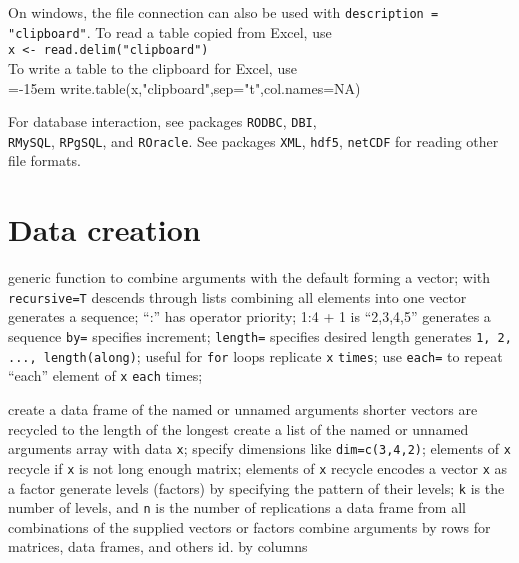 On windows, the file connection can also be used with {\tt description =
"clipboard"}. To read a table copied from Excel, use \\
{\tt x <- read.delim("clipboard")}\\
To write a table to the clipboard for Excel, use \\
{\smalltt  \emergencystretch=-15em write.table(x,"clipboard",sep="\bs t",col.names=NA)}

For database interaction, see packages {\tt RODBC}, {\tt DBI},\\
{\tt RMySQL}, {\tt RPgSQL}, and {\tt ROracle}. See packages {\tt XML},
{\tt hdf5}, {\tt netCDF} for reading other file formats.

\section{Data creation}{}

	{generic function to combine arguments with the default forming a vector; with {\tt recursive=T} descends through lists combining all elements into one vector}
	{generates a sequence; ``:'' has operator priority; 1:4 + 1 is ``2,3,4,5''}
	{generates a sequence {\tt by=} specifies increment; {\tt length=} specifies desired length}
	{generates {\tt 1, 2, ..., length(along)}; useful for {\tt for} loops}
	{replicate {\tt x} {\tt times}; use {\tt each=} to repeat ``each'' element of {\tt x} {\tt each} times;}

	{create a data frame of the named or unnamed arguments}
	{shorter vectors are recycled to the length of the longest}
	{create a list of the named or unnamed arguments }
	{array with data {\tt x}; specify dimensions like {\tt dim=c(3,4,2)}; elements of {\tt x} recycle if {\tt x} is not long enough}
	{matrix; elements of {\tt x} recycle}
	{encodes a vector {\tt x} as a factor}
	{generate levels (factors) by specifying the pattern of their levels; {\tt k} is the number of levels, and {\tt n} is the number of replications}
	{a data frame from all combinations of the supplied vectors or factors}
	{combine arguments by rows for matrices, data frames, and others}
	{id. by columns}
